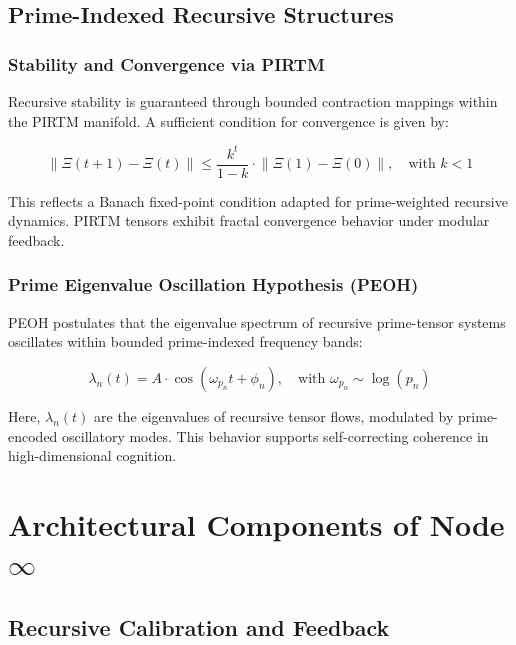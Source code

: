 \documentclass[12pt]{article}
\begin{document}
\subsection{Prime-Indexed Recursive Structures}

\subsubsection*{Stability and Convergence via PIRTM}

Recursive stability is guaranteed through bounded contraction mappings within the PIRTM manifold. A sufficient condition for convergence is given by:

\begin{equation}
\left\| \Xi(t+1) - \Xi(t) \right\| \leq \frac{k^t}{1 - k} \cdot \left\| \Xi(1) - \Xi(0) \right\|, \quad \text{with } k < 1
\end{equation}

This reflects a Banach fixed-point condition adapted for prime-weighted recursive dynamics. PIRTM tensors exhibit fractal convergence behavior under modular feedback.

\subsubsection*{Prime Eigenvalue Oscillation Hypothesis (PEOH)}

PEOH postulates that the eigenvalue spectrum of recursive prime-tensor systems oscillates within bounded prime-indexed frequency bands:

\begin{equation}
\lambda_n(t) = A \cdot \cos\left( \omega_{p_n} t + \phi_n \right), \quad \text{with } \omega_{p_n} \sim \log(p_n)
\end{equation}

Here, $\lambda_n(t)$ are the eigenvalues of recursive tensor flows, modulated by prime-encoded oscillatory modes. This behavior supports self-correcting coherence in high-dimensional cognition.

\section{Architectural Components of Node \( \infty \)}

\subsection{Recursive Calibration and Feedback}
\end{document}
